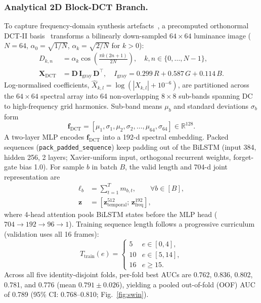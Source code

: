 \documentclass[runningheads]{llncs}
\newcommand{\R}{\mathbb{R}}
\newcommand{\bz}{\mathbf{z}}
\begin{document}
\subsubsection{Analytical 2D Block-DCT Branch.}
To capture frequency-domain synthesis artefacts~\cite{frank2020leveraging}, a precomputed orthonormal DCT-II basis~\cite{ahmed1974dct} transforms a bilinearly down-sampled $64{\times}64$ luminance image ($N{=}64$, $\alpha_0{=}\sqrt{1/N}$, $\alpha_k{=}\sqrt{2/N}$ for $k{>}0$):
\begin{align}
D_{k,n}&=\alpha_k\cos\!\left(\frac{\pi k(2n+1)}{2N}\right),\quad k,n\in\{0,\dots,N{-}1\},\\
\mathbf X_{\mathrm{DCT}}&=\mathbf D\,\mathbf I_{\mathrm{gray}}\,\mathbf D^{\top},\quad I_{\mathrm{gray}}=0.299\,R+0.587\,G+0.114\,B.
\end{align}
Log-normalised coefficients, $\hat X_{k,l}=\log(|X_{k,l}|+10^{-6})$, are partitioned across the $64{\times}64$ spectral array into 64 non-overlapping $8{\times}8$ sub-bands spanning DC to high-frequency grid harmonics. Sub-band means $\mu_b$ and standard deviations $\sigma_b$ form
\begin{equation}
\mathbf f_{\mathrm{DCT}}=[\mu_1,\sigma_1,\mu_2,\sigma_2,\ldots,\mu_{64},\sigma_{64}]\in\R^{128}.
\end{equation}
A two-layer MLP encodes $\mathbf f_{\mathrm{DCT}}$ into a 192-d spectral embedding. Packed sequences (\texttt{pack\_padded\_sequence}) keep padding out of the BiLSTM (input 384, hidden 256, 2 layers; Xavier-uniform input, orthogonal recurrent weights, forget-gate bias 1.0). For sample $b$ in batch $B$, the valid length and 704-d joint representation are
\begin{align}
\ell_b&=\sum_{t=1}^{T}m_{b,t},\qquad\forall b\in[B],\\
\bz&=[\bz_{\mathrm{temporal}}^{512};\,\bz_{\mathrm{freq}}^{192}],
\end{align}
where 4-head attention pools BiLSTM states before the MLP head ($704{\to}192{\to}96{\to}1$). Training sequence length follows a progressive curriculum (validation uses all 16 frames):
\begin{equation}
T_{\mathrm{train}}(e)=\begin{cases}5&e\in[0,4],\\10&e\in[5,14],\\16&e\ge15.\end{cases}
\end{equation}
Across all five identity-disjoint folds, per-fold best AUCs are 0.762, 0.836, 0.802, 0.781, and 0.776 (mean $0.791\pm0.026$), yielding a pooled out-of-fold (OOF) AUC of 0.789 (95\% CI: 0.768--0.810; Fig.~\ref{fig:swin}).
\end{document}
